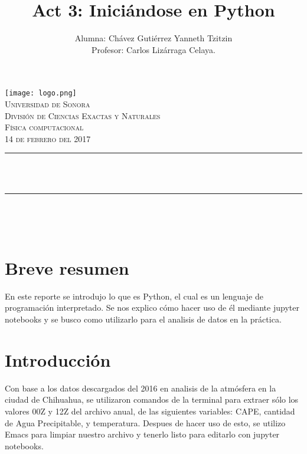 \documentclass[12pt]{article}
\title{Act 3: Iniciándose en Python} %
\author {Alumna: Chávez Gutiérrez Yanneth Tzitzin \\ Profesor: Carlos Lizárraga Celaya. }											%
\makeatletter
\let\thetitle\@title
\let\theauthor\@author
\makeatother
\begin{document}

\begin{titlepage}
	\centering
    \vspace*{0.5 cm}
\texttt{[image: logo.png]}\\%
    \textsc{\Large Universidad de Sonora}\\[1.0 cm]	%
	\textsc{\Large División de Ciencias Exactas y Naturales}\\[0.5 cm]				%
	\textsc{\large Física computacional}\\[0.5 cm]
   \textsc {14 de febrero del 2017} 	
\rule{\linewidth}{0.2 mm} \\[0.4 cm]
	{ \huge \bfseries \thetitle}\\
	\rule{\linewidth}{0.2 mm} \\[0.5 cm]
	
	\begin{minipage}{\textwidth}
		\begin{flushleft} 
        \begin{center}
			\theauthor
             \end{center}
			\end{flushleft}
	\end{minipage}\\[1 cm]
	
 
	\vfill
	
\end{titlepage}
\pagebreak



\section{Breve resumen}
En este reporte se introdujo lo que es Python, el cual es un lenguaje de programación interpretado. Se nos explico cómo hacer uso de él mediante jupyter notebooks y se busco como utilizarlo para el analisis de datos en la práctica. 
\section{Introducción}
Con base a los datos descargados del 2016 en analisis de la atmósfera en la ciudad de Chihuahua, se utilizaron comandos de la terminal para extraer sólo los valores 00Z y 12Z del archivo anual, de las siguientes variables: CAPE, cantidad de Agua Precipitable, y temperatura. Despues de hacer uso de esto, se utilizo Emacs para limpiar nuestro archivo y tenerlo listo para editarlo con jupyter notebooks. 
\end{document}
